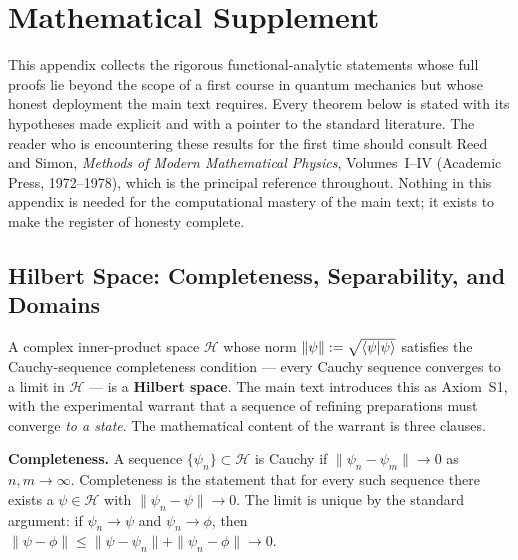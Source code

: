 \chapter{Mathematical Supplement}

\begin{note}
This appendix collects the rigorous functional-analytic statements whose full proofs lie beyond the scope of a first course in quantum mechanics but whose honest deployment the main text requires. Every theorem below is stated with its hypotheses made explicit and with a pointer to the standard literature. The reader who is encountering these results for the first time should consult Reed and Simon, \emph{Methods of Modern Mathematical Physics}, Volumes~I--IV (Academic Press, 1972--1978), which is the principal reference throughout. Nothing in this appendix is needed for the computational mastery of the main text; it exists to make the register of honesty complete.
\end{note}

\section{Hilbert Space: Completeness, Separability, and Domains}
\label{sec:appendix-hilbert}

A complex inner-product space $\mathcal{H}$ whose norm $\|\psi\| := \sqrt{\braket{\psi|\psi}}$ satisfies the Cauchy-sequence completeness condition --- every Cauchy sequence converges to a limit in $\mathcal{H}$ --- is a \textbf{Hilbert space}. The main text introduces this as Axiom~S1, with the experimental warrant that a sequence of refining preparations must converge \emph{to a state}. The mathematical content of the warrant is three clauses.

\medskip\noindent\textbf{Completeness.} A sequence $\{\psi_n\} \subset \mathcal{H}$ is Cauchy if $\|\psi_n - \psi_m\| \to 0$ as $n,m \to \infty$. Completeness is the statement that for every such sequence there exists a $\psi \in \mathcal{H}$ with $\|\psi_n - \psi\| \to 0$. The limit is unique by the standard argument: if $\psi_n \to \psi$ and $\psi_n \to \phi$, then $\|\psi - \phi\| \le \|\psi - \psi_n\| + \|\psi_n - \phi\| \to 0$.

